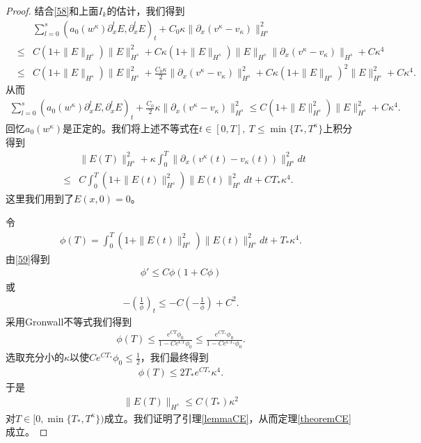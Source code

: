 \begin{proof}
结合\eqref{58}和上面$I_k$的估计，我们得到
\begin{eqnarray*}
 && \sum_{l=0}^s  (a_0(w^\kappa) \partial^l_x E,\partial^l_x E)_t + C_0 \kappa \|\partial_x (v^\kappa-v_\kappa)\|_{H^s}^2 \\
 &\le& C (1+\|E\|_{H^s})\|E\|_{H^s}^2 + C \kappa(1+\|E\|_{H^s})\|E\|_{H^s} \|\partial_x(v^\kappa-v_\kappa)\|_{H^s} + C \kappa^4  \\
 &\le& C (1+\|E\|_{H^s})\|E\|_{H^s}^2 + \frac{C_0\kappa}{2} \|\partial_x(v^\kappa-v_\kappa)\|_{H^s}^2 + C \kappa (1+\|E\|_{H^s})^2 \|E\|_{H^s}^2 + C \kappa^4.
\end{eqnarray*}
从而
\begin{eqnarray*}
  \sum_{l=0}^s  (a_0(w^\kappa) \partial^l_x E,\partial^l_x E)_t + \frac{C_0}{2} \kappa \|\partial_x (v^\kappa-v_\kappa)\|_{H^s}^2 \le   C (1+\|E\|_{H^s}^2)\|E\|_{H^s}^2 + C \kappa^4.
\end{eqnarray*}
回忆$a_0(w^\kappa)$是正定的。我们将上述不等式在$t \in [0,T],\ T \le \min \{T_*,T^\kappa\}$上积分得到
\begin{eqnarray} \label{59}
 && \|E(T)\|_{H^s}^2 + \kappa \int_0^T \|\partial_x(v^\kappa(t)-v_\kappa(t))\|_{H^s}^2 dt \nonumber \\
& \le &  C\int_0^T (1+\|E(t)\|_{H^s}^2)\|E(t)\|_{H^s}^2 dt +CT_* \kappa^4.
\end{eqnarray}
这里我们用到了$E(x, 0)=0$。

令
\begin{eqnarray*}
  \phi(T) =  \int_0^T (1+\|E(t)\|_{H^s}^2)\|E(t)\|_{H^s}^2 dt + T_* \kappa^4.
\end{eqnarray*}
由\eqref{59}得到
\begin{eqnarray*}
  \phi' \le C  \phi(1+C\phi)
\end{eqnarray*}
或
\begin{eqnarray*}
  -(\frac{1}{\phi})_t \le -C (-\frac{1}{\phi})+C^2.
\end{eqnarray*}
采用Gronwall不等式我们得到
\begin{eqnarray*}
  \phi(T) \le \frac{e^{CT} \phi_0}{1-C e^{CT}  \phi_0}\le\frac{e^{CT_*} \phi_0}{1-C e^{CT_*} \phi_0} .
\end{eqnarray*}
选取充分小的$\kappa$以使$C e^{CT_*} \phi_0 \le \frac{1}{2}$，我们最终得到
\begin{eqnarray*}
  \phi(T) \le 2T_*e^{CT_*}\kappa^4.
\end{eqnarray*}
于是
\begin{eqnarray*}
  \|E(T)\|_{H^s} \le C(T_*) \kappa^2
\end{eqnarray*}
对$T \in [0,\min\{T_*,T^\kappa\})$成立。我们证明了引理\ref{lemmaCE}，从而定理\ref{theoremCE}成立。
\end{proof}

%
%

% 





